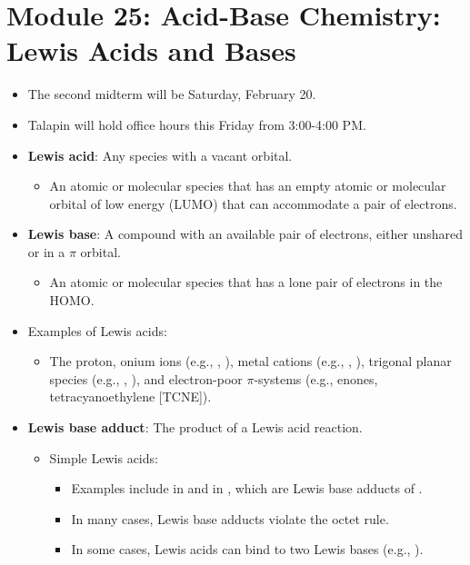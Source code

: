 \documentclass[../notes.tex]{subfiles}
\begin{document}
\section{Module 25: Acid-Base Chemistry: Lewis Acids and Bases}
\begin{itemize}
    \item {}The second midterm will be Saturday, February 20.
    \item Talapin will hold office hours this Friday from 3:00-4:00 PM.
    \item \textbf{Lewis acid}: Any species with a vacant orbital.
    \begin{itemize}
        \item An atomic or molecular species that has an empty atomic or molecular orbital of low energy (LUMO) that can accommodate a pair of electrons.
    \end{itemize}
    \item \textbf{Lewis base}: A compound with an available pair of electrons, either unshared or in a $\pi$ orbital.
    \begin{itemize}
        \item An atomic or molecular species that has a lone pair of electrons in the HOMO.
    \end{itemize}
    \item Examples of Lewis acids:
    \begin{itemize}
        \item The proton, onium ions (e.g., , ), metal cations (e.g., , ), trigonal planar species (e.g., , ), and electron-poor $\pi$-systems (e.g., enones, tetracyanoethylene [TCNE]).
    \end{itemize}
    \item \textbf{Lewis base adduct}: The product of a Lewis acid reaction.
    \begin{itemize}
        \item Simple Lewis acids:
        \begin{itemize}
            \item Examples include  in  and  in , which are Lewis base adducts of .
            \item In many cases, Lewis base adducts violate the octet rule.
            \item In some cases, Lewis acids can bind to two Lewis bases (e.g., ).
        \end{itemize}

\end{itemize}
\end{itemize}
\end{document}

